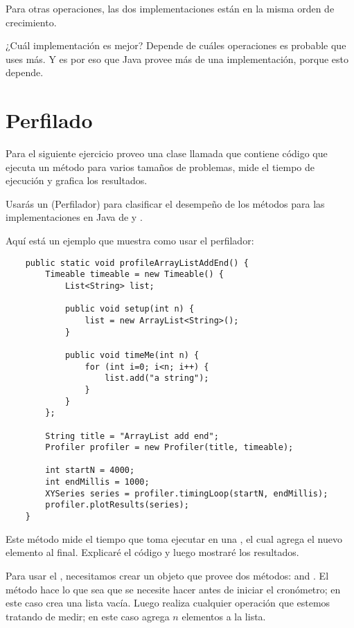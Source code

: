 \documentclass[12pt]{book}
\theoremstyle{exercise}
\begin{document}
Para otras operaciones, las dos implementaciones están en la misma orden
de crecimiento.


¿Cuál implementación es mejor? Depende de cuáles operaciones es
probable que uses más. Y es por eso que Java provee más de una
implementación, porque esto depende.


\section{Perfilado}

Para el siguiente ejercicio proveo una clase llamada  que
contiene código que ejecuta un método para varios tamaños de problemas,
mide el tiempo de ejecución y grafica los resultados.


Usarás un  (Perfilador) para clasificar el desempeño
de los métodos  para las implementaciones en Java de
 y .

Aquí está un ejemplo que muestra como usar el perfilador:

\begin{verbatim}
    public static void profileArrayListAddEnd() {
        Timeable timeable = new Timeable() {
            List<String> list;

            public void setup(int n) {
                list = new ArrayList<String>();
            }

            public void timeMe(int n) {
                for (int i=0; i<n; i++) {
                    list.add("a string");
                }
            }
        };

        String title = "ArrayList add end";
        Profiler profiler = new Profiler(title, timeable);

        int startN = 4000;
        int endMillis = 1000;
        XYSeries series = profiler.timingLoop(startN, endMillis);
        profiler.plotResults(series);
    }
\end{verbatim}

Este método mide el tiempo que toma ejecutar  en una
, el cual agrega el nuevo elemento al final. Explicaré
el código y luego mostraré los resultados.


Para usar el , necesitamos crear un objeto 
que provee dos métodos:  and .
El método  hace lo que sea que se necesite hacer antes de iniciar
el cronómetro; en este caso crea una lista vacía. Luego 
realiza cualquier operación que estemos tratando de medir; en este caso
agrega $n$ elementos a la lista.
\end{document}
